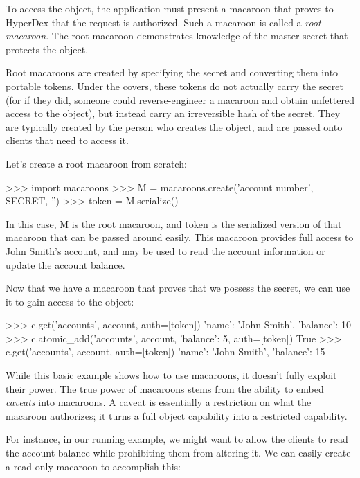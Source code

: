 To access the object, the application must present a macaroon that proves to
HyperDex that the request is authorized.  Such a macaroon is called a {\em root macaroon}.
The root macaroon demonstrates knowledge of the master secret that protects the object.

Root macaroons are created by specifying the secret and converting them into portable
tokens. Under the covers, these tokens do not actually carry the secret (for if they
did, someone could reverse-engineer a macaroon and obtain unfettered access to the object), 
but instead carry an irreversible hash of the secret. They are typically created by the
person who creates the object, and are passed onto clients that need to access it.

Let's create a root macaroon from scratch:

\begin{pythoncode}
>>> import macaroons
>>> M = macaroons.create('account number', SECRET, '')
>>> token = M.serialize()
\end{pythoncode}

In this case, M is the root macaroon, and token is the serialized version of that macaroon that
can be passed around easily. This macaroon provides full access to John Smith's account, and may be used to
read the account information or update the account balance.

Now that we have a macaroon that proves that we possess the secret, we can use
it to gain access to the object:

\begin{pythoncode}
>>> c.get('accounts', account, auth=[token])
{'name': 'John Smith', 'balance': 10}
>>> c.atomic_add('accounts', account, {'balance': 5}, auth=[token])
True
>>> c.get('accounts', account, auth=[token])
{'name': 'John Smith', 'balance': 15}
\end{pythoncode}

While this basic example shows how to use macaroons, it doesn't fully exploit
their power. The true power of macaroons stems from the ability to embed 
{\em caveats} into macaroons. A caveat is essentially a restriction on what the
macaroon authorizes; it turns a full object capability into a restricted capability.

For instance, in our running example, we might want to allow the clients to read the
account balance while prohibiting them from altering it. We can easily
create a read-only macaroon to accomplish this:

